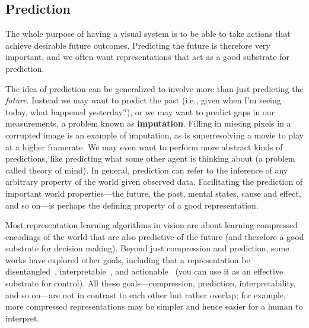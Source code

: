 
\subsection{Prediction}
The whole purpose of having a visual system is to be able to take actions that achieve desirable future outcomes. Predicting the future is therefore very important, and we often want representations that act as a good substrate for prediction. %

The idea of prediction can be generalized to involve more than just predicting the \textit{future}. Instead we may want to predict the past (i.e., given when I'm seeing today, what happened yesterday?), or we may want to predict gaps in our measurements, a problem known as {\bf imputation}. Filling in missing pixels in a corrupted image is an example of imputation, as is superresolving a movie to play at a higher framerate. We may even want to perform more abstract kinds of predictions, like predicting what some other agent is thinking about (a problem called theory of mind). In general, prediction can refer to the inference of any arbitrary property of the world given observed data. Facilitating the prediction of important world properties—the future, the past, mental states, cause and effect, and so on—is perhaps the defining property of a good representation.

Most representation learning algorithms in vision are about learning compressed encodings of the world that are also predictive of the future (and therefore a good substrate for decision making). Beyond just compression and prediction, some works have explored other goals, including that a representation be disentangled~\cite{bengio2013representation}, interpretable~\cite{koh2020concept}, and actionable~\cite{soatto2013actionable} (you can use it as an effective substrate for control). All these goals—compression, prediction, interpretability, and so on—are not in contrast to each other but rather overlap; for example, more compressed representations may be simpler and hence easier for a human to interpret.


